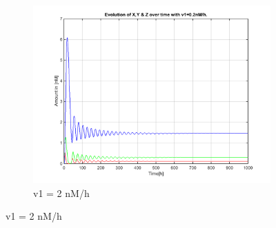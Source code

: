 \documentclass[10pt,a4paper,oneside,twocolumn]{article}
\numberwithin{equation}{section} %
\begin{document}
\begin{figure}
\begin{subfigure}[b]{0.3\textwidth}
	    \includegraphics[width=\textwidth]{LotsofthesameA/A-A2.png}
	    \caption{v1 = 2 nM/h}
	\end{subfigure}
	 

\end{figure}
\end{document}
